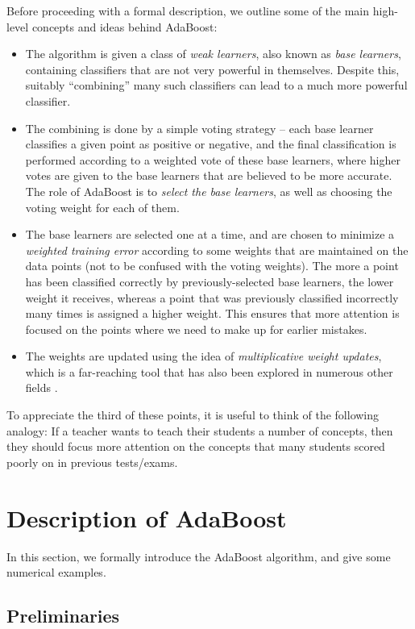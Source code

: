 \documentclass[english,12pt]{article}
\begin{document}
	Before proceeding with a formal description, we outline some of the main high-level concepts and ideas behind AdaBoost:
	\begin{itemize}
		\item The algorithm is given a class of {\em weak learners}, also known as {\em base learners}, containing classifiers that are not very powerful in themselves.  Despite this, suitably ``combining'' many such classifiers can lead to a much more powerful classifier.
		\item The combining is done by a simple voting strategy -- each base learner classifies a given point as positive or negative, and the final classification is performed according to a weighted vote of these base learners, where higher votes are given to the base learners that are believed to be more accurate. The role of AdaBoost is to {\em select the base learners}, as well as choosing the voting weight for each of them.
		\item The base learners are selected one at a time, and are chosen to minimize a {\em weighted training error} according to some weights that are maintained on the data points (not to be confused with the voting weights).  The more a point has been classified correctly by previously-selected base learners, the lower weight it receives, whereas a point that was previously classified incorrectly many times is assigned a higher weight.  This ensures that more attention is focused on the points where we need to make up for earlier mistakes.
		\item The weights are updated using the idea of {\em multiplicative weight updates}, which is a far-reaching tool that has also been explored in numerous other fields \cite{mult_weights}.
	\end{itemize}
	To appreciate the third of these points, it is useful to think of the following analogy: If a teacher wants to teach their students a number of concepts, then they should focus more attention on the concepts that many students scored poorly on in previous tests/exams.
	
	\section{Description of AdaBoost}
	
	In this section, we formally introduce the AdaBoost algorithm, and give some numerical examples.
	
	\subsection{Preliminaries}
	
\end{document}
